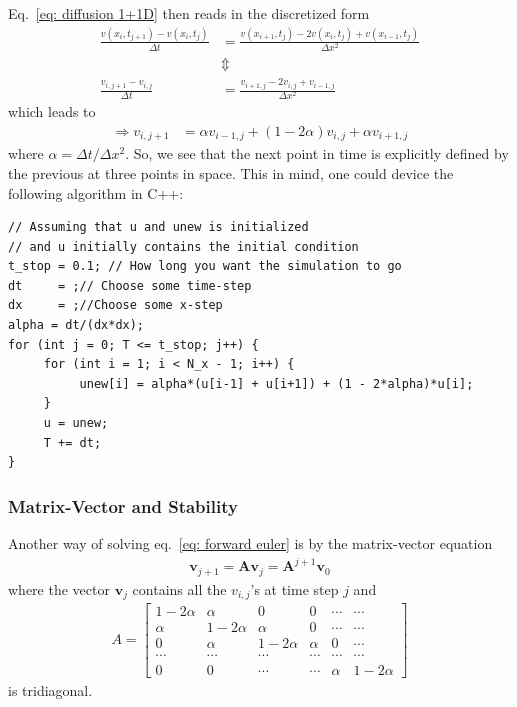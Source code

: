 \documentclass[twoside, 11pt]{article}
\begin{document}
		Eq.~\eqref{eq: diffusion 1+1D} then reads in the discretized form
		\begin{align*}
			\frac{v(x_i, t_{j+1}) - v(x_i, t_j)}{\Delta t} &= \frac{v(x_{i+1}, t_j) - 2v(x_i, t_j) + v(x_{i-1}, t_j)}{\Delta x^2} \\
			&\Updownarrow \\
			\frac{v_{i, j+1} - v_{i, j}}{\Delta t} &= \frac{v_{i+1, j} - 2v_{i, j} + v_{i-1, j}}{\Delta x^2}
		\end{align*}
		which leads to
		\begin{align}
			\Rightarrow v_{i, j+1} &= \alpha v_{i-1,j} + (1-2\alpha)v_{i,j} + \alpha v_{i+1,j}\label{eq: forward euler}
		\end{align}
		where $\alpha = \Delta t/\Delta x^2$. So, we see that the next point in time is explicitly defined by the previous at three points in space. This in mind, one could device the following algorithm in C++:
		\begin{lstlisting}
// Assuming that u and unew is initialized 
// and u initially contains the initial condition
t_stop = 0.1; // How long you want the simulation to go
dt     = ;// Choose some time-step
dx     = ;//Choose some x-step
alpha = dt/(dx*dx);
for (int j = 0; T <= t_stop; j++) {
     for (int i = 1; i < N_x - 1; i++) {
          unew[i] = alpha*(u[i-1] + u[i+1]) + (1 - 2*alpha)*u[i];
     }
     u = unew;
     T += dt;
}
		\end{lstlisting}
		
		\subsubsection{Matrix-Vector and Stability}
			Another way of solving eq.~\eqref{eq: forward euler} is by the matrix-vector equation
			\begin{align*}
				\mathbf{v}_{j+1} = \mathbf{A}\mathbf{v}_j = \mathbf{A}^{j+1}\mathbf{v}_0
			\end{align*}
			where the vector $\mathbf{v}_j$ contains all the $v_{i,j}$'s at time step $j$ and
			\begin{align*}
				A =	
				\begin{bmatrix}
					1-2\alpha & \alpha & 0 & 0 & \cdots & \cdots \\
					\alpha		& 1-2\alpha & \alpha & 0 & \cdots & \cdots \\
					0 & \alpha & 1-2\alpha & \alpha & 0 & \cdots \\
					\cdots & \cdots & \cdots & \cdots & \cdots & \cdots \\
					0& 0 & \cdots & \cdots & \alpha & 1-2\alpha
				\end{bmatrix}
			\end{align*}
			is tridiagonal.
			
\end{document}
